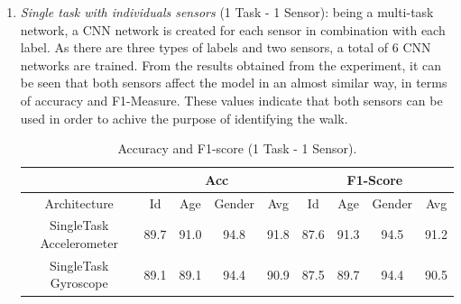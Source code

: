 \begin{enumerate}
    \item \emph{Single task with individuals sensors} (1 Task - 1 Sensor): being a multi-task 
    network, a CNN network is created for each sensor in combination 
    with each label. As there are three types of labels and two sensors, a 
    total of 6 CNN networks are trained. From the results obtained from 
    the experiment, it can be seen that both sensors affect the model in an 
    almost similar way, in terms of accuracy and F1-Measure. These values 
    indicate that both sensors can be used in order to achive the purpose 
    of identifying the walk.
    \begin{table}[h!]
        \centering
        \begin{adjustbox}{max width=\textwidth}
        \begin{tabular}{|c||ccc|c||ccc|c|}
            \hline
                & \multicolumn{4}{c||}{Acc} & \multicolumn{4}{c|}{F1-Score} \\
            \hline
                Architecture & Id & Age & Gender & Avg & Id & Age & Gender & Avg\\
            \hline
                SingleTask Accelerometer & 89.7 & 91.0 & 94.8 & 91.8 & 87.6 & 91.3 & 94.5 & 91.2\\
                SingleTask Gyroscope& 89.1 & 89.1 & 94.4 & 90.9 & 87.5 & 89.7 & 94.4 & 90.5\\
            \hline 
        \end{tabular}
        \end{adjustbox}
        \caption{Accuracy and F1-score (1 Task - 1 Sensor).}
        \label{table accuracy and F1 (1 Task - 1 Sensor)}
    \end{table}


\end{enumerate}
